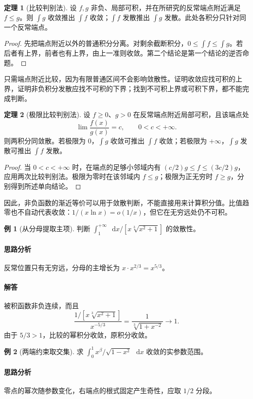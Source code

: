\documentclass[UTF8,fontset=fandol,12pt,oneside,openany]{ctexrep}
\newcommand{\dd}{\mathop{}\!\mathrm d}
\theoremstyle{definition}
\newtheorem{theorem}{定理}[chapter]
\newtheorem{example}{例}[chapter]
\begin{document}
\begin{theorem}[比较判别法]
设 $f,g$ 非负、局部可积，并在所研究的反常端点附近满足 $f\le g$。则 $\int g$ 收敛推出 $\int f$ 收敛；$\int f$ 发散推出 $\int g$ 发散。此处各积分只针对同一个反常端点。
\end{theorem}
\begin{proof}
先把端点附近以外的普通积分分离。对剩余截断积分，$0\le\int f\le\int g$。若后者有上界，前者也有上界，由上一准则收敛。第二个结论是第一个结论的逆否命题。
\end{proof}
只需端点附近比较，因为有限普通区间不会影响敛散性。证明收敛应找可积的上界，证明非负积分发散应找不可积的下界；找到不可积上界或可积下界，都不能完成判断。

\begin{theorem}[极限比较判别法]
设 $f\ge0$、$g>0$ 在反常端点附近局部可积，且该端点处
\[
\lim\frac{f(x)}{g(x)}=c,\qquad 0<c<+\infty.
\]
则两积分同敛散。若极限为 $0$，$\int g$ 收敛可推出 $\int f$ 收敛；若极限为 $+\infty$，$\int g$ 发散可推出 $\int f$ 发散。
\end{theorem}
\begin{proof}
当 $0<c<+\infty$ 时，在端点的足够小邻域内有
$(c/2)g\le f\le(3c/2)g$，应用两次比较判别法。极限为零时在该邻域内 $f\le g$；极限为正无穷时 $f\ge g$，分别得到所述单向结论。
\end{proof}
因此，非负函数的渐近等价可以用于敛散判断，不能直接用来计算积分值。比值趋零也不自动代表收敛：$1/(x\ln x)=o(1/x)$，但它在无穷远处仍不可积。

\begin{example}[从分母提取主项]
判断 $\int_1^{+\infty}\dd x/[x\sqrt[3]{x^2+1}]$ 的敛散性。
\end{example}
\paragraph{思路分析} 反常位置只有无穷远，分母的主增长为 $x\cdot x^{2/3}=x^{5/3}$。
\paragraph{解答} 被积函数非负连续，而且
\[
\frac{1/[x\sqrt[3]{x^2+1}]}{x^{-5/3}}
=\frac1{\sqrt[3]{1+x^{-2}}}\to1.
\]
由于 $5/3>1$，比较的幂积分收敛，原积分收敛。

\begin{example}[两端约束取交集]
求 $\int_0^1 x^\beta/\sqrt{1-x^2}\,\dd x$ 收敛的实参数范围。
\end{example}
\paragraph{思路分析} 零点的幂次随参数变化，右端点的根式固定产生奇性，应取 $1/2$ 分段。
\end{document}
